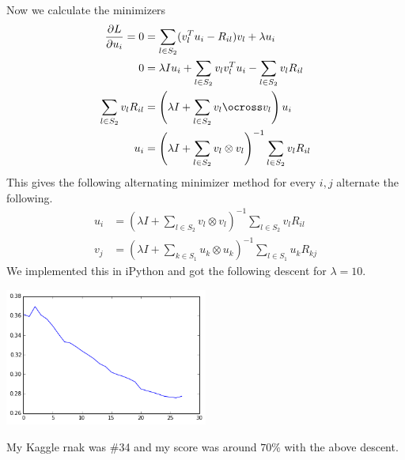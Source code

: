 \documentclass[letter]{article}
\newenvironment{menumerate}{%
  \edef\backupindent{\the\parindent}%
  \enumerate%
  \setlength{\parindent}{\backupindent}%
}{\endenumerate}
\begin{document}
\begin{menumerate}
\begin{menumerate}
  Now we calculate the minimizers
  \begin{equation*}
  \begin{aligned}
   \frac{\partial L}{\partial u_i} = 0 &= \sum_{l \in S_2} (v_l^Tu_i - R_{il})v_l + \lambda u_i \\
   0 &= \lambda I u_i + \sum_{l \in S_2} v_lv_l^Tu_i -  \sum_{l \in S_2}  v_lR_{il}  \\
   \sum_{l \in S_2}  v_lR_{il} &= \left(\lambda I + \sum_{l \in S_2} v_l\ocross v_l\right) u_i \\
   u_i &= \left(\lambda I + \sum_{l \in S_2} v_l\otimes v_l\right)^{-1} \sum_{l \in S_2}  v_lR_{il}
  \end{aligned}
  \end{equation*}
  This gives the following alternating minimizer method for every $i,j$ alternate the following.
  \begin{equation}
  \begin{aligned}
       u_i &= \left(\lambda I + \sum_{l \in S_2} v_l\otimes v_l\right)^{-1} \sum_{l \in S_2}  v_lR_{il} \\
       v_j &= \left(\lambda I + \sum_{k \in S_1} u_k\otimes u_k\right)^{-1} \sum_{l \in S_1}  u_kR_{kj}
    \end{aligned}  
  \end{equation}
  We implemented this in iPython and got the following descent for $\lambda = 10$.
  \begin{center}
    \includegraphics[width=0.5\textwidth]{alternatingdescent.png}
  \end{center}
  \item My Kaggle rnak was \#34 and my score was around $70\%$ with the above descent.
  \end{menumerate}
\end{menumerate}
\end{document}
